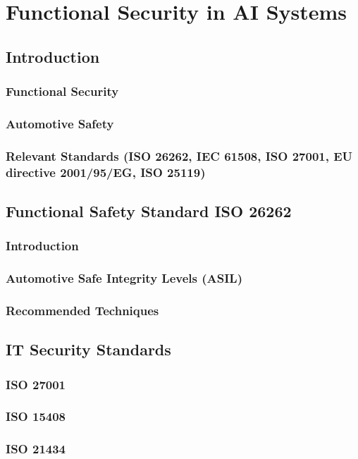     \chapter{Functional Security in AI Systems}
    \section{Introduction}
    \subsection{Functional Security}
    \subsection{Automotive Safety}
    \subsection{Relevant Standards (ISO 26262, IEC 61508, ISO 27001, EU directive 2001/95/EG, ISO 25119)}
    \section{Functional Safety Standard ISO 26262}
    \subsection{Introduction}
    \subsection{Automotive Safe Integrity Levels (ASIL)}
    \subsection{Recommended Techniques}
    \section{IT Security Standards}
    \subsection{ISO 27001}
    \subsection{ISO 15408}
    \subsection{ISO 21434}
